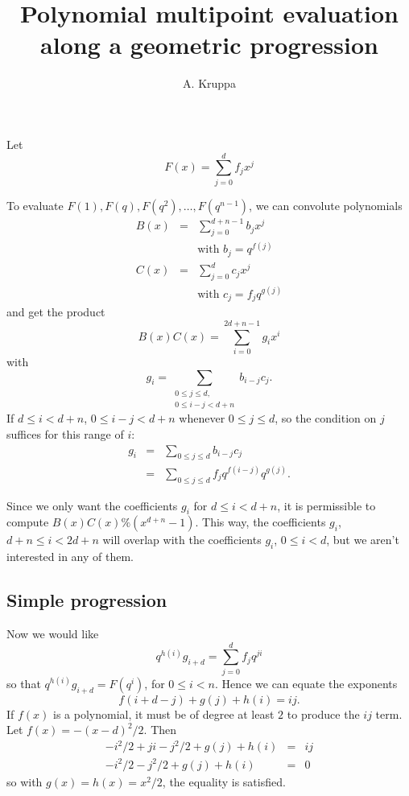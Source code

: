 \documentclass{article}
\begin{document}
\title{Polynomial multipoint evaluation along a geometric progression}
\author{A. Kruppa}
\maketitle

Let
\begin{displaymath}
F(x) = \sum_{j=0}^d f_j x^j
\end{displaymath}

To evaluate $F(1), F(q), F(q^2), \ldots ,F(q^{n-1})$, we can convolute 
polynomials
\begin{eqnarray*}
B(x) & = & \sum_{j=0}^{d + n -1} b_j x^j \\
     &   & \textrm{with } b_j = q^{f(j)}\\
C(x) & = & \sum_{j=0}^d c_j x^j \\
     &   & \textrm{with } c_j = f_j q^{g(j)}
\end{eqnarray*}
and get the product
\begin{displaymath}
B(x)C(x) = \sum_{i=0}^{2d+n-1} g_i x^i
\end{displaymath}
with
\begin{displaymath}
g_i = \sum_{\substack{0\leq j\leq d,\\0\leq i-j < d+n}} b_{i-j} c_{j}.
\end{displaymath}
If $d \leq i < d+n$, $0 \leq i-j < d+n$ whenever $0\leq j\leq d$, 
so the condition on $j$ suffices for this range of $i$:
\begin{eqnarray*}
g_i & = & \sum_{0\leq j\leq d} b_{i-j} c_j \\
    & = & \sum_{0\leq j\leq d} f_j q^{f(i-j)} q^{g(j)}.
\end{eqnarray*}

Since we only want the coefficients $g_i$ for $d\leq i < d+n$, it is
permissible to compute $B(x)C(x) \% (x^{d+n}-1)$. This way, the coefficients
$g_i$, $d+n \leq i < 2d + n$ will overlap with the coefficients $g_i$, 
$0 \leq i < d$, but we aren't interested in any of them.


\subsection{Simple progression}
Now we would like 
\begin{displaymath}
q^{h(i)} g_{i+d} =  \sum_{j=0}^{d} f_j q^{ji}
\end{displaymath}
so that $q^{h(i)} g_{i+d} = F(q^i)$, for $0 \leq i < n$.
%
Hence we can equate the exponents
\begin{displaymath}
  f(i+d-j) + g(j) + h(i) = ij.
\end{displaymath}
If $f(x)$ is a polynomial, it must be of degree at least $2$ to produce the 
$ij$ term. Let $f(x)=-(x-d)^2/2$. Then 
\begin{eqnarray*}
  -i^2/2 + ji - j^2/2 + g(j) + h(i) & = & ij \\
  -i^2/2 - j^2/2 + g(j) + h(i) & = & 0
\end{eqnarray*}
so with $g(x) = h(x) = x^2/2$, the equality is satisfied.
\end{document}
